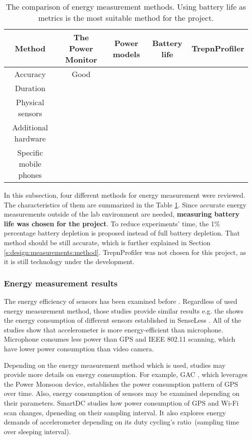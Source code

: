 \begin{table}[H]
	\centering
    \begin{tabular}{| c | c | c | c | c | }
    \hline
    Method & The Power Monitor & Power models & Battery life & TrepnProfiler \\ \hline
    Accuracy & Good & & & \\ \hline
    Duration & & & & \\\hline
    Physical sensors & & & &\\ \hline
    Additional hardware & & & &\\ \hline
    Specific mobile phones & & & &\\ \hline
    \end{tabular}
    \caption{The comparison of energy measurement methods. Using battery life as metrics is the most suitable method for the project.}
	\label{table:energymeasurementmethods}
\end{table}
	
In this subsection, four different methods for energy measurement were reviewed. The characteristics of them are summarized in the Table \ref{table:energymeasurementmethods}. Since accurate energy measurements outside of the lab environment are needed, \textbf{measuring battery life was chosen for the project}.  To reduce experiments' time, the 1\% percentage battery depletion is proposed instead of full battery depletion. That method should be still accurate, which is further explained in Section \ref{s:design:measurements:method}. TrepnProfiler was not chosen for this project, as it is still technology under the development.

\subsubsection{Energy measurement results}
The energy efficiency of sensors has been examined before \cite{benabdesslem:senseless} \cite{constandache:localization} \cite{wang:eemss} \cite{chon:smartdc}. Regardless of used energy measurement method, those studies provide similar results e.g. the  shows the energy consumption of different sensors established in SenseLess \cite{benabdesslem:senseless}. All of the studies show that accelerometer is more energy-efficient than microphone. Microphone consumes less power than GPS and IEEE 802.11 scanning, which have lower power consumption than video camera.


Depending on the energy measurement method which is used, studies may provide more details on energy consumption. For example, GAC \cite{youssef:gac}, which leverages the Power Monsoon device, establishes the power consumption pattern of GPS over time. Also, energy consumption of sensors may be examined depending on their parameters. SmartDC \cite{chon:smartdc} studies how power consumption of GPS and Wi-Fi scan changes, dpeneding on their sampling interval. It also explores energy demands of accelerometer depending on its duty cycling's ratio\ (sampling time over sleeping interval).

